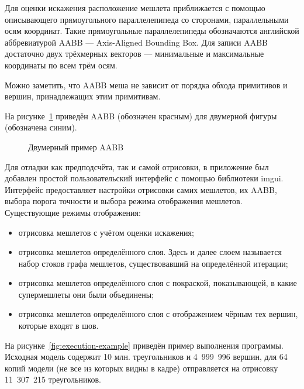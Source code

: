 Для оценки искажения расположение мешлета приближается с помощью описывающего прямоугольного параллелепипеда со сторонами, параллельными осям координат.
Такие прямоугольные параллелепипеды обозначаются английской аббревиатурой AABB --- Axis-Aligned Bounding Box.
Для записи AABB достаточно двух трёхмерных векторов --- минимальные и максимальные координаты по всем трём осям.

Можно заметить, что AABB меша не зависит от порядка обхода примитивов и вершин, принадлежащих этим примитивам.

На рисунке~\ref{fig:AABB} приведён AABB (обозначен красным) для двумерной фигуры (обозначена синим).

\begin{figure}[H]
    \centering
    \caption{Двумерный пример AABB}
    \label{fig:AABB}
\end{figure}

Для отладки как предподсчёта, так и самой отрисовки, в приложение был добавлен простой пользовательский интерфейс с помощью библиотеки imgui.
Интерфейс предоставляет настройки отрисовки самих мешлетов, их AABB, выбора порога точности и выбора режима отображения мешлетов.
Существующие режимы отображения:
\begin{itemize}
    \item отрисовка мешлетов с учётом оценки искажения;
    \item отрисовка мешлетов определённого слоя.
    Здесь и далее слоем называется набор стоков графа мешлетов, существовавший на определённой итерации;
    \item отрисовка мешлетов определённого слоя с покраской, показывающей, в какие супермешлеты они были объединены;
    \item отрисовка мешлетов определённого слоя с отображением чёрным тех вершин, которые входят в шов.
\end{itemize}

На рисунке~\ref{fig:execution-example} приведён пример выполнения программы.
Исходная модель содержит 10 млн. треугольников и 4~999~996 вершин, для 64 копий модели (не все из которых видны в кадре) отправляется на отрисовку 11~307~215 треугольников.

